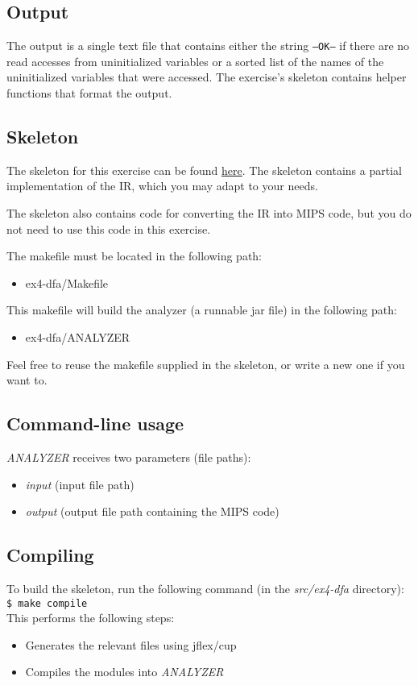 \documentclass{article}
\begin{document}
\subsection{Output}
The output is a single text file that contains either the string \texttt{--OK--}
if there are no read accesses from uninitialized variables or a sorted list of the names of the uninitialized variables that were accessed. The exercise's skeleton contains helper functions that format the output.

\subsection{Skeleton}
The skeleton for this exercise can be found \href{https://github.com/davidtr1037/compilation-tau/tree/master/src/ex4-dfa}{here}.
The skeleton contains a partial implementation of the IR, which you may adapt to your needs.

The skeleton also contains code for converting the IR into MIPS code, but you do not need to use this code in this exercise.

The makefile must be located in the following path:
\begin{itemize}
    \item ex4-dfa/Makefile
\end{itemize}
This makefile will build the analyzer (a runnable jar file) in the following path:
\begin{itemize}
    \item ex4-dfa/ANALYZER
\end{itemize}
Feel free to reuse the makefile supplied in the skeleton,
or write a new one if you want to.

\subsection{Command-line usage}
\textit{ANALYZER} receives two parameters (file paths):
\begin{itemize}
    \item \textit{input} (input file path)
    \item \textit{output} (output file path containing the MIPS code)
\end{itemize}

\subsection{Compiling}
To build the skeleton, run the following command (in the \textit{src/ex4-dfa} directory): \\
\texttt{\$ make compile} \\
This performs the following steps:
\begin{itemize}
    \item Generates the relevant files using jflex/cup
    \item Compiles the modules into \textit{ANALYZER}
\end{itemize}
\end{document}
